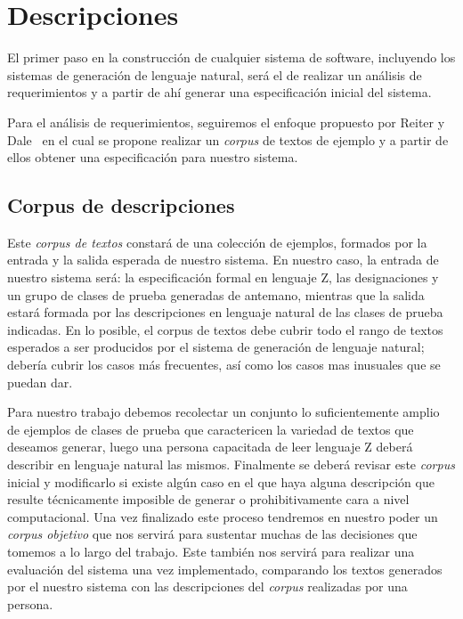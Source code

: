 \chapter{Descripciones}
\label{cap:corpus}

El primer paso en la construcción de cualquier sistema de software, incluyendo los sistemas de generación de lenguaje natural, será el de realizar un análisis de requerimientos y a partir de ahí generar una especificación inicial del sistema. 

Para el análisis de requerimientos, seguiremos el enfoque propuesto por Reiter y Dale~\cite{reiter_dale} en el cual se propone realizar un \emph{corpus} de textos de ejemplo y a partir de ellos obtener una especificación para nuestro sistema.  

\section{Corpus de descripciones}                 

Este \emph{corpus de textos} constará de una colección de ejemplos, formados por la entrada y la salida esperada de nuestro sistema. En nuestro caso, la entrada de nuestro sistema será: la especificación formal en lenguaje Z, las designaciones y un grupo de clases de prueba generadas de antemano, mientras que la salida estará formada por las descripciones en lenguaje natural de las clases de prueba indicadas. En lo posible, el corpus de textos debe cubrir todo el rango de textos esperados a ser producidos por el sistema de generación de lenguaje natural; debería cubrir los casos más frecuentes, así como los casos mas inusuales que se puedan dar.

Para nuestro trabajo debemos recolectar un conjunto lo suficientemente amplio de ejemplos de clases de prueba que caractericen la variedad de textos que deseamos generar, luego una persona capacitada de leer lenguaje Z deberá describir en lenguaje natural las mismos. Finalmente se deberá revisar este \emph{corpus} inicial y modificarlo si existe algún caso en el que haya alguna descripción que resulte técnicamente imposible de generar o prohibitivamente cara a nivel computacional. Una vez finalizado este proceso tendremos en nuestro poder un \emph{corpus objetivo} que nos servirá para sustentar muchas de las decisiones que tomemos a lo largo del trabajo. Este también nos servirá para realizar una evaluación del sistema una vez implementado, comparando los textos generados por el nuestro sistema con las descripciones del \emph{corpus} realizadas por una persona.

